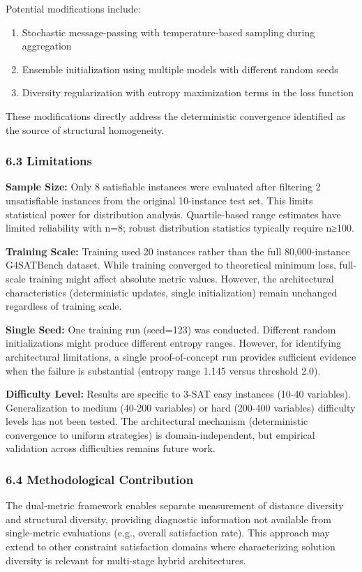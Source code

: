 Potential modifications include:
\begin{enumerate}
\item Stochastic message-passing with temperature-based sampling during aggregation
\item Ensemble initialization using multiple models with different random seeds
\item Diversity regularization with entropy maximization terms in the loss function
\end{enumerate}

These modifications directly address the deterministic convergence identified as the source of structural homogeneity.

\subsubsection{6.3 Limitations}

\textbf{Sample Size:} Only 8 satisfiable instances were evaluated after filtering 2 unsatisfiable instances from the original 10-instance test set. This limits statistical power for distribution analysis. Quartile-based range estimates have limited reliability with n=8; robust distribution statistics typically require n≥100.

\textbf{Training Scale:} Training used 20 instances rather than the full 80,000-instance G4SATBench dataset. While training converged to theoretical minimum loss, full-scale training might affect absolute metric values. However, the architectural characteristics (deterministic updates, single initialization) remain unchanged regardless of training scale.

\textbf{Single Seed:} One training run (seed=123) was conducted. Different random initializations might produce different entropy ranges. However, for identifying architectural limitations, a single proof-of-concept run provides sufficient evidence when the failure is substantial (entropy range 1.145 versus threshold 2.0).

\textbf{Difficulty Level:} Results are specific to 3-SAT easy instances (10-40 variables). Generalization to medium (40-200 variables) or hard (200-400 variables) difficulty levels has not been tested. The architectural mechanism (deterministic convergence to uniform strategies) is domain-independent, but empirical validation across difficulties remains future work.

\subsubsection{6.4 Methodological Contribution}

The dual-metric framework enables separate measurement of distance diversity and structural diversity, providing diagnostic information not available from single-metric evaluations (e.g., overall satisfaction rate). This approach may extend to other constraint satisfaction domains where characterizing solution diversity is relevant for multi-stage hybrid architectures.
